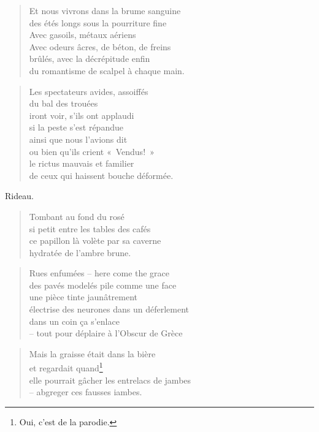   \begin{verse}
    Et nous vivrons dans la brume sanguine\\
    des étés longs sous la pourriture fine\\
    Avec gasoils, métaux aériens\\
    Avec odeurs âcres, de béton, de freins\\
    brûlés, avec la décrépitude enfin\\
    du romantisme de scalpel à chaque main.
  \end{verse}
  \begin{verse}
    Les spectateurs avides, assoiffés\\
    du bal des trouées\\
    iront voir, s’ils ont applaudi\\
    si la peste s’est répandue\\
    ainsi que nous l’avions dit\\
    ou bien qu’ils crient «~Vendus!~»\\
    le rictus mauvais et familier\\
    de ceux qui haissent bouche déformée.
  \end{verse}
  \begin{center}
    Rideau.
  \end{center}

  \begin{verse}
    Tombant au fond du rosé\\
    si petit entre les tables des cafés\\
    ce papillon là volète par sa caverne\\
    hydratée de l’ambre brune.
  \end{verse}
  \begin{verse}
    Rues enfumées -- here come the grace\\
    des pavés modelés pile comme une face\\
    une pièce tinte jaunâtrement\\
    électrise des neurones dans un déferlement\\
    dans un coin ça s’enlace\\
    -- tout pour déplaire à l’Obscur de Grèce
  \end{verse}
  \begin{verse}
    Mais la graisse était dans la bière\\
    et regardait quand\footnote{Oui, c’est de la parodie.}\\
    elle pourrait gâcher les entrelacs de jambes\\
    -- abgreger ces fausses iambes.
  \end{verse}

